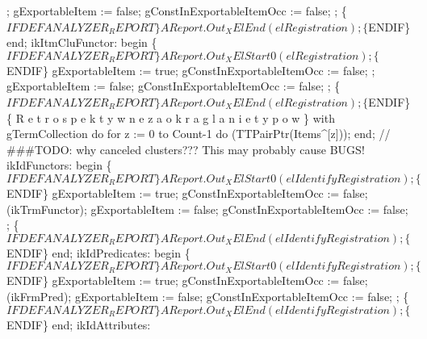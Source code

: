                ;
               gExportableItem := false;
               gConstInExportableItemOcc := false;
               ;
               \{$IFDEF ANALYZER_REPORT\}
               AReport.Out_XElEnd(elRegistration);
               \{$ENDIF\}
            end;
         ikItmCluFunctor:
            begin
               \{$IFDEF ANALYZER_REPORT\}
               AReport.Out_XElStart0(elRegistration);
               \{$ENDIF\}
               gExportableItem := true;
               gConstInExportableItemOcc := false;
               ;
               gExportableItem := false;
               gConstInExportableItemOcc := false;
               ;
               \{$IFDEF ANALYZER_REPORT\}
               AReport.Out_XElEnd(elRegistration);
               \{$ENDIF\}
               \{ R e t r o s p e k t y w n e   z a o k r a g l a n i e   t y p o w \}
               with gTermCollection do
                  for z := 0 to Count-1 do (TTPairPtr(Items^[z]));
            end;
         // ###TODO: why canceled clusters??? This may probably cause BUGS!
         ikIdFunctors:
            begin
               \{$IFDEF ANALYZER_REPORT\}
               AReport.Out_XElStart0(elIdentifyRegistration);
               \{$ENDIF\}
               gExportableItem := true;
               gConstInExportableItemOcc := false;
               (ikTrmFunctor);
               gExportableItem := false;
               gConstInExportableItemOcc := false;
               ;
               \{$IFDEF ANALYZER_REPORT\}
               AReport.Out_XElEnd(elIdentifyRegistration);
               \{$ENDIF\}
            end;
         ikIdPredicates:
            begin
               \{$IFDEF ANALYZER_REPORT\}
               AReport.Out_XElStart0(elIdentifyRegistration);
               \{$ENDIF\}
               gExportableItem := true;
               gConstInExportableItemOcc := false;
               (ikFrmPred);
               gExportableItem := false;
               gConstInExportableItemOcc := false;
               ;
               \{$IFDEF ANALYZER_REPORT\}
               AReport.Out_XElEnd(elIdentifyRegistration);
               \{$ENDIF\}
            end;
         ikIdAttributes:
